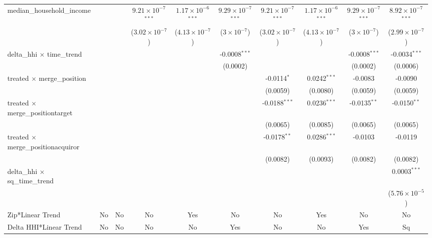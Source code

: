 \begin{table}[H]
{\begin{tabular}{lccccccccc}
 median\_household\_income&   &    & $9.21\times 10^{-7}$$^{***}$ & $1.17\times 10^{-6}$$^{***}$ & $9.29\times 10^{-7}$$^{***}$ & $9.21\times 10^{-7}$$^{***}$ & $1.17\times 10^{-6}$$^{***}$ & $9.29\times 10^{-7}$$^{***}$ & $8.92\times 10^{-7}$$^{***}$\\ 

   &   &    & ($3.02\times 10^{-7}$) & ($4.13\times 10^{-7}$) & ($3\times 10^{-7}$) & ($3.02\times 10^{-7}$) & ($4.13\times 10^{-7}$) & ($3\times 10^{-7}$) & ($2.99\times 10^{-7}$)\\ 

 delta\_hhi $\times $ time\_trend&   &    &    &    & -0.0008$^{***}$ &    &    & -0.0008$^{***}$ & -0.0034$^{***}$\\ 

   &   &    &    &    & (0.0002) &    &    & (0.0002) & (0.0006)\\ 

 treated $\times $ merge\_position&   &    &    &    &    & -0.0114$^{*}$ & 0.0242$^{***}$ & -0.0083 & -0.0090\\ 

   &   &    &    &    &    & (0.0059) & (0.0080) & (0.0059) & (0.0059)\\ 

 treated $\times $ merge\_positiontarget&   &    &    &    &    & -0.0188$^{***}$ & 0.0236$^{***}$ & -0.0135$^{**}$ & -0.0150$^{**}$\\ 

   &   &    &    &    &    & (0.0065) & (0.0085) & (0.0065) & (0.0065)\\ 

 treated $\times $ merge\_positionacquiror&   &    &    &    &    & -0.0178$^{**}$ & 0.0286$^{***}$ & -0.0103 & -0.0119\\ 

   &   &    &    &    &    & (0.0082) & (0.0093) & (0.0082) & (0.0082)\\ 

 delta\_hhi $\times $ sq\_time\_trend&   &    &    &    &    &    &    &    & 0.0003$^{***}$\\ 

   &   &    &    &    &    &    &    &    & ($5.76\times 10^{-5}$)\\ 

 Zip*Linear Trend & No & No & No & Yes & No & No & Yes & No & No\\ 

 Delta HHI*Linear Trend & No & No & No & No & Yes & No & No & Yes & Sq\\ 


\end{tabular}}
\end{table}
